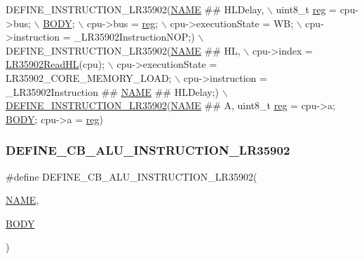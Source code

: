 \begin{DoxyCode}
    DEFINE\_INSTRUCTION\_LR35902(\mbox{\hyperlink{inflate_8h_a164ea0159d5f0b5f12a646f25f99eceaa67bc2ced260a8e43805d2480a785d312}{NAME}} ## HLDelay, \(\backslash\)
        uint8\_t \mbox{\hyperlink{decoder-arm_8c_af44c02f7785479603f59b662f3dfae6a}{reg}} = cpu->bus; \(\backslash\)
        \mbox{\hyperlink{gzlog_8c_aa6bdf6a6d9916c343e1e17774d84a156}{BODY}}; \(\backslash\)
        cpu->bus = \mbox{\hyperlink{decoder-arm_8c_af44c02f7785479603f59b662f3dfae6a}{reg}}; \(\backslash\)
        cpu->executionState = WB; \(\backslash\)
        cpu->instruction = \_LR35902InstructionNOP;) \(\backslash\)
    DEFINE\_INSTRUCTION\_LR35902(\mbox{\hyperlink{inflate_8h_a164ea0159d5f0b5f12a646f25f99eceaa67bc2ced260a8e43805d2480a785d312}{NAME}} ## HL, \(\backslash\)
        cpu->index = \mbox{\hyperlink{isa-lr35902_8c_a2aecac31902540d73a813542994471ff}{LR35902ReadHL}}(cpu); \(\backslash\)
        cpu->executionState = LR35902\_CORE\_MEMORY\_LOAD; \(\backslash\)
        cpu->instruction = \_LR35902Instruction ## \mbox{\hyperlink{inflate_8h_a164ea0159d5f0b5f12a646f25f99eceaa67bc2ced260a8e43805d2480a785d312}{NAME}} ## HLDelay;) \(\backslash\)
    \mbox{\hyperlink{isa-lr35902_8c_a3128fc43c5d01e8b51f67901c0b4b5ef}{DEFINE\_INSTRUCTION\_LR35902}}(\mbox{\hyperlink{inflate_8h_a164ea0159d5f0b5f12a646f25f99eceaa67bc2ced260a8e43805d2480a785d312}{NAME}} ## A, uint8\_t 
      \mbox{\hyperlink{decoder-arm_8c_af44c02f7785479603f59b662f3dfae6a}{reg}} = cpu->a; \mbox{\hyperlink{gzlog_8c_aa6bdf6a6d9916c343e1e17774d84a156}{BODY}}; cpu->a = \mbox{\hyperlink{decoder-arm_8c_af44c02f7785479603f59b662f3dfae6a}{reg}})
\end{DoxyCode}
\mbox{\label{isa-lr35902_8c_ad6f60c80260fd54f80082ddc8002bb51}} 
\subsubsection{\texorpdfstring{D\+E\+F\+I\+N\+E\+\_\+\+C\+B\+\_\+\+A\+L\+U\+\_\+\+I\+N\+S\+T\+R\+U\+C\+T\+I\+O\+N\+\_\+\+L\+R35902}{DEFINE\_CB\_ALU\_INSTRUCTION\_LR35902}}
{\footnotesize\ttfamily \#define D\+E\+F\+I\+N\+E\+\_\+\+C\+B\+\_\+\+A\+L\+U\+\_\+\+I\+N\+S\+T\+R\+U\+C\+T\+I\+O\+N\+\_\+\+L\+R35902(\begin{DoxyParamCaption}\item[{}]{\mbox{\hyperlink{inflate_8h_a164ea0159d5f0b5f12a646f25f99eceaa67bc2ced260a8e43805d2480a785d312}{N\+A\+ME}},  }\item[{}]{\mbox{\hyperlink{gzlog_8c_aa6bdf6a6d9916c343e1e17774d84a156}{B\+O\+DY}} }\end{DoxyParamCaption})}

